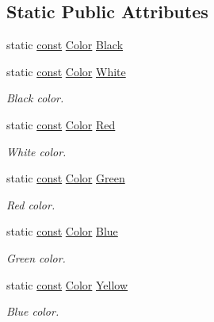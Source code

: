 \subsection*{Static Public Attributes}
\begin{DoxyCompactItemize}
\item 
static \hyperlink{term__entry_8h_a57bd63ce7f9a353488880e3de6692d5a}{const} \hyperlink{unionarcade_1_1_color}{Color} \hyperlink{unionarcade_1_1_color_adf9314b9d80e839db37907dc8e281175}{Black}
\item 
static \hyperlink{term__entry_8h_a57bd63ce7f9a353488880e3de6692d5a}{const} \hyperlink{unionarcade_1_1_color}{Color} \hyperlink{unionarcade_1_1_color_aa8bd809fbf902dbbe53b9bb6802eb57f}{White}
\begin{DoxyCompactList}\small\item\em Black color. \end{DoxyCompactList}\item 
static \hyperlink{term__entry_8h_a57bd63ce7f9a353488880e3de6692d5a}{const} \hyperlink{unionarcade_1_1_color}{Color} \hyperlink{unionarcade_1_1_color_a7101e34126fdb3c14d53045681938293}{Red}
\begin{DoxyCompactList}\small\item\em White color. \end{DoxyCompactList}\item 
static \hyperlink{term__entry_8h_a57bd63ce7f9a353488880e3de6692d5a}{const} \hyperlink{unionarcade_1_1_color}{Color} \hyperlink{unionarcade_1_1_color_aa7271d3c9e5fc07926979eaa610af7e4}{Green}
\begin{DoxyCompactList}\small\item\em Red color. \end{DoxyCompactList}\item 
static \hyperlink{term__entry_8h_a57bd63ce7f9a353488880e3de6692d5a}{const} \hyperlink{unionarcade_1_1_color}{Color} \hyperlink{unionarcade_1_1_color_a37e72a85b3ce04f4642a48cae2f60644}{Blue}
\begin{DoxyCompactList}\small\item\em Green color. \end{DoxyCompactList}\item 
static \hyperlink{term__entry_8h_a57bd63ce7f9a353488880e3de6692d5a}{const} \hyperlink{unionarcade_1_1_color}{Color} \hyperlink{unionarcade_1_1_color_aa437de4029652dba87b0b64ca488f8ff}{Yellow}
\begin{DoxyCompactList}\small\item\em Blue color. \end{DoxyCompactList}\item 

\end{DoxyCompactItemize}
